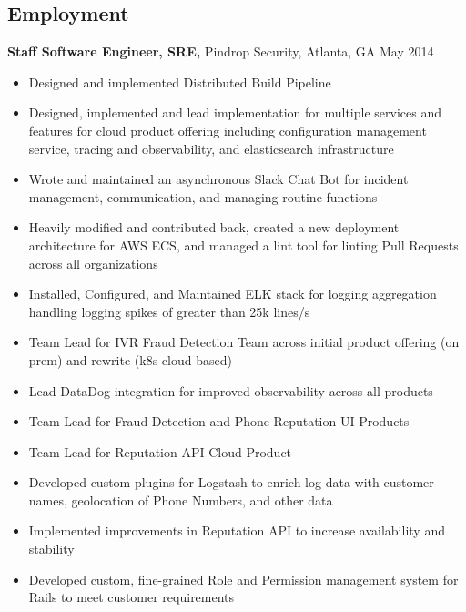 \documentclass[margin]{res}
\begin{document}
\begin{resume}
\section{Employment}

    {\bf Staff Software Engineer, SRE,} Pindrop Security, Atlanta, GA \hfill May 2014
        \begin{itemize} \itemsep -2pt %
            \item Designed and implemented Distributed Build Pipeline
            \item Designed, implemented and lead implementation for multiple services and features for cloud
                product offering including configuration management service, tracing and observability, and
                elasticsearch infrastructure
            \item Wrote and maintained an asynchronous Slack Chat Bot for incident management, communication,
                and managing routine functions
            \item Heavily modified and contributed back, created a new deployment architecture for AWS ECS,
                and managed a lint tool for linting Pull Requests across all organizations
            \item Installed, Configured, and Maintained ELK stack for logging aggregation handling logging
                spikes of greater than 25k lines/s
            \item Team Lead for IVR Fraud Detection Team across initial product offering (on prem) and rewrite
                (k8s cloud based)
            \item Lead DataDog integration for improved observability across all products
            \item Team Lead for Fraud Detection and Phone Reputation UI Products
            \item Team Lead for Reputation API Cloud Product
            \item Developed custom plugins for Logstash to enrich log data with customer names, geolocation of
                Phone Numbers, and other data
            \item Implemented improvements in Reputation API to increase availability and stability
            \item Developed custom, fine-grained Role and Permission management system for Rails to meet
                customer requirements
        \end{itemize}


\end{resume}
\end{document}
